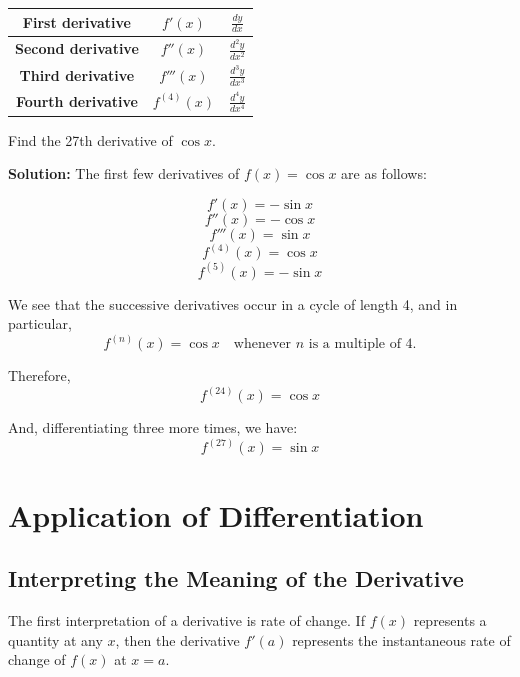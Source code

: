 \documentclass[12pt]{article}
\theoremstyle{beautifulthm}
\begin{document}
\begin{center}
\begin{tabular}{|c|c|c|}
\hline
\textbf{First derivative} & \(f'(x)\) & \(\frac{dy}{dx}\)  \\
\hline
\textbf{Second derivative} & \(f''(x)\) & \(\frac{d^2y}{dx^2}\) \\
\hline
\textbf{Third derivative} & \(f'''(x)\) & \(\frac{d^3y}{dx^3}\)  \\
\hline
\textbf{Fourth derivative} & \(f^{(4)}(x)\) & \(\frac{d^4y}{dx^4}\) \\
\hline
\end{tabular}
\end{center}


\begin{tcolorbox}[colback=examplebg, colframe=red!75!black, title=\textbf{EXAMPLE 2: Derivatives of Trigonometric Functions}, fonttitle=\bfseries, sharp corners]

Find the 27th derivative of \(\cos x\).

\tcblower
\textbf{Solution:}
The first few derivatives of \(f(x) = \cos x\) are as follows:

\[
f'(x) = -\sin x
\]
\[
f''(x) = -\cos x
\]
\[
f'''(x) = \sin x
\]
\[
f^{(4)}(x) = \cos x
\]
\[
f^{(5)}(x) = -\sin x
\]

We see that the successive derivatives occur in a cycle of length 4, and in particular,
\[
f^{(n)}(x) = \cos x \quad \text{whenever } n \text{ is a multiple of 4.}
\]

Therefore,
\[
f^{(24)}(x) = \cos x
\]

And, differentiating three more times, we have:
\[
f^{(27)}(x) = \sin x
\]

\end{tcolorbox}

\newpage
\section{Application of Differentiation}
\subsection{Interpreting the Meaning of the Derivative}
The first interpretation of a derivative is rate of change. If \( f(x) \) represents a quantity at any \( x \), then the derivative \( f'(a) \) represents the instantaneous rate of change of \( f(x) \) at \( x = a \).
\end{document}
